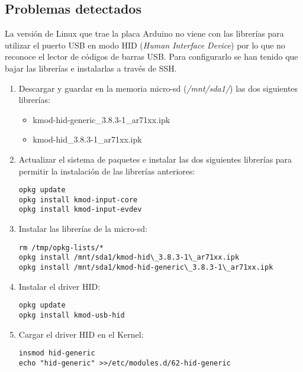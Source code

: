 \subsection{Problemas detectados}

La versión de Linux que trae la placa Arduino no viene con las librerías para utilizar el puerto USB en modo HID (\emph{Human Interface Device}) por lo que no reconoce el lector de códigos de barras USB. Para configurarlo se han tenido que bajar las librerías e instalarlas a través de SSH.

\begin{enumerate}

    \item Descargar y guardar en la memoria micro-sd (\emph{/mnt/sda1/}) las dos siguientes librerías:

        \begin{itemize}
            \item kmod-hid-generic\_3.8.3-1\_ar71xx.ipk
            \item kmod-hid\_3.8.3-1\_ar71xx.ipk
        \end{itemize}

    \item Actualizar el sistema de paquetes e instalar las dos siguientes librerías para permitir la instalación de las librerías anteriores:

        \begin{lstlisting}
opkg update
opkg install kmod-input-core
opkg install kmod-input-evdev
        \end{lstlisting}

    \item Instalar las librerías de la micro-sd:

        \begin{lstlisting}
rm /tmp/opkg-lists/*
opkg install /mnt/sda1/kmod-hid\_3.8.3-1\_ar71xx.ipk
opkg install /mnt/sda1/kmod-hid-generic\_3.8.3-1\_ar71xx.ipk
        \end{lstlisting}

    \item Instalar el driver HID:

        \begin{lstlisting}
opkg update
opkg install kmod-usb-hid
        \end{lstlisting}

    \item Cargar el driver HID en el Kernel:

        \begin{lstlisting}
insmod hid-generic
echo "hid-generic" >>/etc/modules.d/62-hid-generic
        \end{lstlisting}


\end{enumerate}
